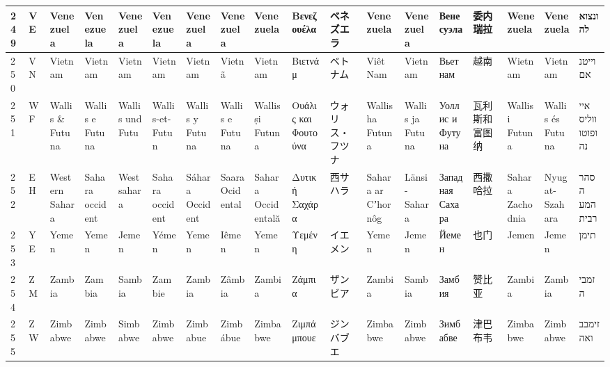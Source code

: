 \begin{longtable}{|l|l|l|l|l|l|l|l|l|l|l|l|l|l|l|l|l|l|}
249 & VE & Venezuela & Venezuela & Venezuela & Venezuela & Venezuela & Venezuela & Venezuela & Βενεζουέλα & ベネズエラ & Venezuela & Venezuela & Венесуэла & 委内瑞拉 & Wenezuela & Venezuela & ונצואלה \\ \hline 
250 & VN & Vietnam & Vietnam & Vietnam & Vietnam & Vietnam & Vietnã & Vietnam & Βιετνάμ & ベトナム & Viêt Nam & Vietnam & Вьетнам & 越南 & Wietnam & Vietnam & וייטנאם \\ \hline 
251 & WF & Wallis \& Futuna & Wallis e Futuna & Wallis und Futu & Wallis-et-Futun & Wallis y Futuna & Wallis e Futuna & Wallis și Futuna & Ουάλις και Φουτούνα & ウォリス・フツナ & Wallis ha Futuna & Wallis ja Futuna & Уоллис и Футуна & 瓦利斯和富图纳 & Wallis i Futuna & Wallis és Futuna & איי ווליס ופוטונה \\ \hline 
252 & EH & Western Sahara & Sahara occident & Westsahara & Sahara occident & Sáhara Occident & Saara Ocidental & Sahara Occidentală & Δυτική Σαχάρα & 西サハラ & Sahara ar Cʼhornôg & Länsi-Sahara & Западная Сахара & 西撒哈拉 & Sahara Zachodnia & Nyugat-Szahara & סהרה המערבית \\ \hline 
253 & YE & Yemen & Yemen & Jemen & Yémen & Yemen & Iêmen & Yemen & Υεμένη & イエメン & Yemen & Jemen & Йемен & 也门 & Jemen & Jemen & תימן \\ \hline 
254 & ZM & Zambia & Zambia & Sambia & Zambie & Zambia & Zâmbia & Zambia & Ζάμπια & ザンビア & Zambia & Sambia & Замбия & 赞比亚 & Zambia & Zambia & זמביה \\ \hline 
255 & ZW & Zimbabwe & Zimbabwe & Simbabwe & Zimbabwe & Zimbabue & Zimbábue & Zimbabwe & Ζιμπάμπουε & ジンバブエ & Zimbabwe & Zimbabwe & Зимбабве & 津巴布韦 & Zimbabwe & Zimbabwe & זימבבואה \\ \hline 
 \end{longtable}
